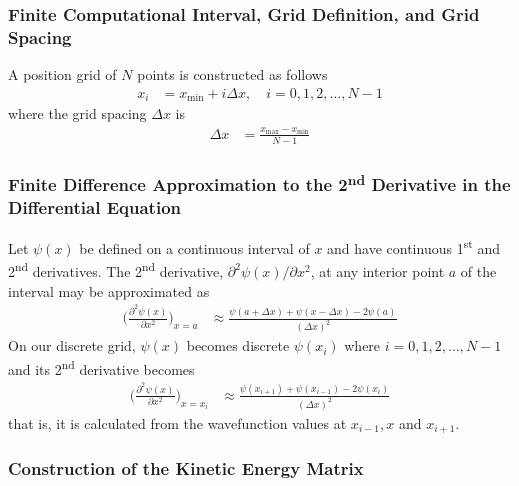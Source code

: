 \subsubsection{Finite Computational Interval, Grid Definition, and Grid Spacing}

A position grid of $N$ points is constructed as follows
\begin{align*}
    x_i &= x_\text{min} + i\Delta x, \quad i=0,1,2,\dots,N-1
\end{align*}
%
where the grid spacing $\Delta x$ is
\begin{align*}
    \Delta x &= \frac{x_\text{max} - x_\text{min}}{N-1}
\end{align*}

\subsubsection{Finite Difference Approximation to the 2\textsuperscript{nd} Derivative in the Differential Equation}

Let $\psi(x)$ be defined on a continuous interval of $x$ and have continuous 1\textsuperscript{st} and 2\textsuperscript{nd} derivatives. The 2\textsuperscript{nd} derivative, $\partial^2 \psi(x)/\partial x^2$, at any interior point $a$ of the interval may be approximated as
\begin{align*}
    \Bigg(\frac{\partial^2 \psi(x)}{\partial x^2}\Bigg)_{x=a} &\approx \frac{\psi(a+\Delta x) + \psi(x-\Delta x) - 2\psi(a)}{(\Delta x)^2}
\end{align*}
%
On our discrete grid, $\psi(x)$ becomes discrete $\psi(x_i)$ where $i=0,1,2,\dots,N-1$ and its 2\textsuperscript{nd} derivative becomes
\begin{align*}
    \Bigg(\frac{\partial^2 \psi(x)}{\partial x^2}\Bigg)_{x=x_i} &\approx \frac{\psi(x_{i+1}) + \psi(x_{i-1}) - 2\psi(x_{i})}{(\Delta x)^2}
\end{align*}
%
that is, it is calculated from the wavefunction values at $x_{i-1},x$ and $x_{i+1}$.

\subsubsection{Construction of the Kinetic Energy Matrix}

